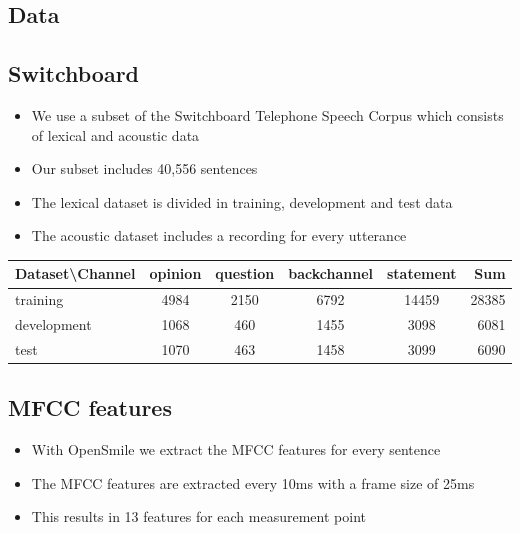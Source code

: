 \documentclass[a0,landscape]{a0poster}
\begin{document}
\begin{multicols}{3}

\color{Black} %
\large

\section*{Data}
\subsection*{Switchboard}

\begin{itemize}
	\item We use a subset of the Switchboard Telephone Speech Corpus which consists of lexical and acoustic data
	\item Our subset includes 40,556 sentences
	\item The lexical dataset is divided in training, development and test data
	\item The acoustic dataset includes a recording for every utterance
\end{itemize}

\begin{tabular}{ l| c c c c || r}
	Dataset\textbackslash Channel & opinion & question & backchannel & statement & Sum\\
	\hline
	training & 4984 & 2150 & 6792 & 14459 & 28385\\
	development & 1068 & 460 & 1455 & 3098 & 6081\\
	test & 1070 & 463 & 1458 & 3099 & 6090\\
\end{tabular}

\subsection*{MFCC features}
\begin{itemize}
	\item With OpenSmile we extract the MFCC features for every sentence
	\item The MFCC features are extracted every 10ms with a frame size of 25ms
	\item This results in 13 features for each measurement point
\end{itemize}


\end{multicols}
\end{document}
